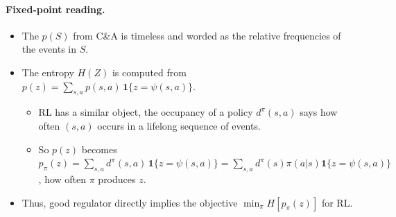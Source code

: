 \documentclass[10pt]{article}
\begin{document}
\paragraph{{Fixed-point reading.}}
\begin{itemize}
  \item The $p(S)$ from C\&A is timeless and worded as the relative frequencies of the events in $S$.
  \item The entropy $H(Z)$ is computed from $p(z) = \sum_{s,a} p(s,a)\, \mathbf 1\{z = \psi(s,a)\}$.
  \begin{itemize}
    \item RL has a similar object, the occupancy of a policy $d^\pi(s,a)$ says how often $(s,a)$ occurs in a lifelong sequence of events.
    \item So $p(z)$ becomes $p_\pi(z) = \sum_{s,a} d^\pi(s,a)\, \mathbf 1\{z = \psi(s,a)\} = \sum_{s,a}d^\pi(s)\pi(a|s) \mathbf 1\{z = \psi(s,a)\}$, how often $\pi$ produces $z$.
  \end{itemize}
  \item Thus, good regulator directly implies the objective $\min_\pi H[p_\pi(z)]$ for RL.
\end{itemize}
\end{document}
